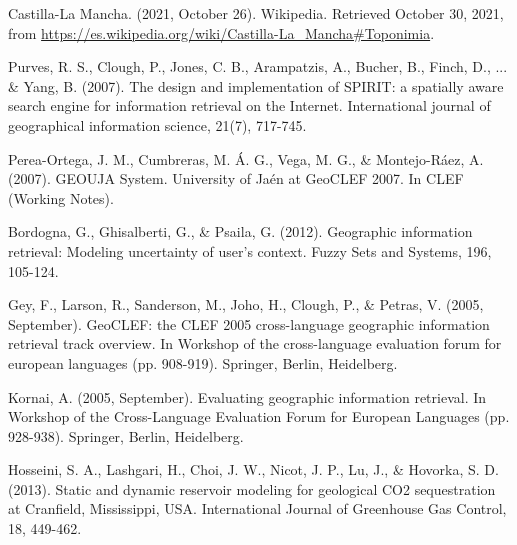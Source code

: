 \documentclass{llncs}
\begin{document}
\begin{thebibliography}{}
Castilla-La Mancha. (2021, October 26). Wikipedia. Retrieved October 30, 2021,
from \url{https://es.wikipedia.org/wiki/Castilla-La_Mancha#Toponimia}.

 Purves, R. S., Clough, P., Jones, C. B., Arampatzis, A., Bucher, B.,
Finch, D., ... \& Yang, B. (2007). The design and implementation of SPIRIT: a
spatially aware search engine for information retrieval on the Internet.
International journal of geographical information science, 21(7), 717-745.

 Perea-Ortega, J. M., Cumbreras, M. Á. G., Vega, M. G., \&
Montejo-Ráez, A. (2007). GEOUJA System. University of Jaén at GeoCLEF 2007. In
CLEF (Working Notes).

 Bordogna, G., Ghisalberti, G., \& Psaila, G. (2012). Geographic
information retrieval: Modeling uncertainty of user's context. Fuzzy Sets and
Systems, 196, 105-124.

Gey, F., Larson, R., Sanderson, M., Joho, H., Clough, P., \& Petras, V.
(2005, September). GeoCLEF: the CLEF 2005 cross-language geographic information
retrieval track overview. In Workshop of the cross-language evaluation forum
for european languages (pp. 908-919). Springer, Berlin, Heidelberg.

Kornai, A. (2005, September). Evaluating geographic information retrieval.
In Workshop of the Cross-Language Evaluation Forum for European Languages
(pp. 928-938). Springer, Berlin, Heidelberg.

Hosseini, S. A., Lashgari, H., Choi, J. W., Nicot, J. P., Lu, J., \& Hovorka,
S. D. (2013). Static and dynamic reservoir modeling for geological CO2
sequestration at Cranfield, Mississippi, USA. International Journal of
Greenhouse Gas Control, 18, 449-462.



\end{thebibliography}
\clearpage
{} %
\renewcommand{\indexname}{Subject Index}

\end{document}
